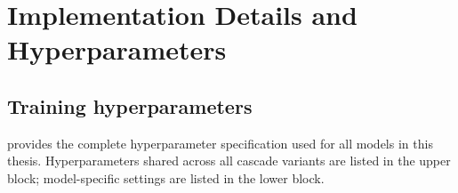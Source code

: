\chapter{Implementation Details and Hyperparameters}
\label{app:implementation}

\section*{Training hyperparameters}

 provides the complete hyperparameter specification used for all models in this thesis. Hyperparameters shared across all cascade variants are listed in the upper block; model-specific settings are listed in the lower block.

